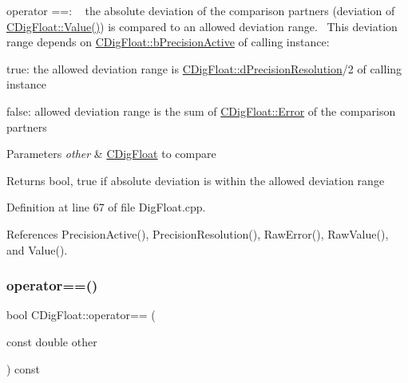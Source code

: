 operator ==\+: ~\newline
 the absolute deviation of the comparison partners (deviation of \hyperlink{classCDigFloat_af74b8cd0935294b6371f551b7a1ff640}{C\+Dig\+Float\+::\+Value()}) is compared to an allowed deviation range.~\newline
 This deviation range depends on \hyperlink{classCDigFloat_aa1f6ed0312a2aa6ae5ee2abd195adefc}{C\+Dig\+Float\+::b\+Precision\+Active} of calling instance\+: 


\begin{DoxyItemize}
\item true\+: the allowed deviation range is \hyperlink{classCDigFloat_a7f9809fa0b25da57f5c8c18a02b7d1a7}{C\+Dig\+Float\+::d\+Precision\+Resolution}/2 of calling instance
\item false\+: allowed deviation range is the sum of \hyperlink{classCDigFloat_a1b067b1bde507408956fa65bef7368bb}{C\+Dig\+Float\+::\+Error} of the comparison partners
\end{DoxyItemize}


\begin{DoxyParams}{Parameters}
{\em other} & \hyperlink{classCDigFloat}{C\+Dig\+Float} to compare \\
\hline
\end{DoxyParams}
\begin{DoxyReturn}{Returns}
bool, true if absolute deviation is within the allowed deviation range 
\end{DoxyReturn}


Definition at line 67 of file Dig\+Float.\+cpp.



References Precision\+Active(), Precision\+Resolution(), Raw\+Error(), Raw\+Value(), and Value().

\mbox{\label{classCDigFloat_abb8746adc3bd94e002f7674eb6ab1165}} 
\subsubsection{\texorpdfstring{operator==()}{operator==()}\hspace{0.1cm}{\footnotesize\ttfamily [2/2]}}
{\footnotesize\ttfamily bool C\+Dig\+Float\+::operator== (\begin{DoxyParamCaption}\item[{const double}]{other }\end{DoxyParamCaption}) const}



